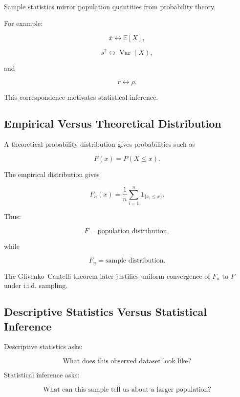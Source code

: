Sample statistics mirror population quantities from probability theory.

For example:

\[
\boxed{
\overline{x}
\longleftrightarrow
\mathbb{E}[X],
}
\]

\[
\boxed{
s^2
\longleftrightarrow
\operatorname{Var}(X),
}
\]

and

\[
\boxed{
r
\longleftrightarrow
\rho.
}
\]

This correspondence motivates statistical inference.

\subsection{Empirical Versus Theoretical Distribution}
\label{subsec:empirical-versus-theoretical}

A theoretical probability distribution gives probabilities such as

\[
F(x)
=
P(X\leq x).
\]

The empirical distribution gives

\[
F_n(x)
=
\frac1n
\sum_{i=1}^{n}
\mathbf{1}_{\{x_i\leq x\}}.
\]

Thus:

\[
\boxed{
F
=
\text{population distribution},
}
\]

while

\[
\boxed{
F_n
=
\text{sample distribution}.
}
\]

The Glivenko--Cantelli theorem later justifies uniform convergence of
\(F_n\) to \(F\) under i.i.d. sampling.

\subsection{Descriptive Statistics Versus Statistical Inference}
\label{subsec:descriptive-versus-inference}

Descriptive statistics asks:

\[
\boxed{
\text{What does this observed dataset look like?}
}
\]

Statistical inference asks:

\[
\boxed{
\text{What can this sample tell us about a larger population?}
}
\]

